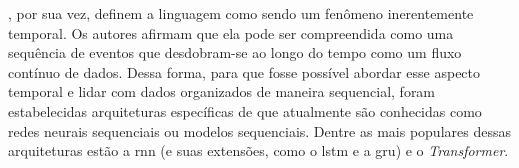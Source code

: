 








, por sua vez, definem a linguagem como sendo um fenômeno inerentemente temporal. Os autores afirmam que ela pode ser compreendida como uma sequência de eventos que desdobram-se ao longo do tempo como um fluxo contínuo de dados.
Dessa forma, para que fosse possível abordar esse aspecto temporal e lidar com dados organizados de maneira sequencial, foram estabelecidas arquiteturas específicas de  que atualmente são conhecidas como redes neurais sequenciais ou modelos sequenciais.
Dentre as mais populares dessas arquiteturas estão a \acrfull{rnn} (e suas extensões, como o \acrfull{lstm} e a \acrfull{gru}) e o \textit{Transformer}.


